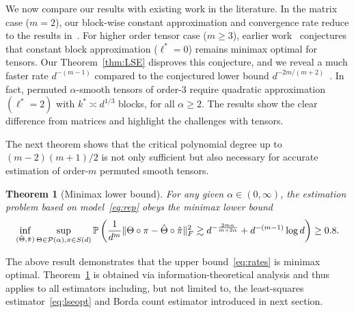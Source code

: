 \documentclass{article}
\newtheorem{thm}{Theorem}
\theoremstyle{definition}
\begin{document}
We now compare our results with existing work in the literature. %
In the matrix case ($m=2$), our block-wise constant approximation and convergence rate reduce to the results in~\cite{klopp2017oracle}. For higher order tensor case ($m\geq 3$), earlier work~\citep{balasubramanian2021nonparametric} conjectures that constant block approximation ($\ell^*=0$) remains minimax optimal for tensors. 
Our Theorem~\ref{thm:LSE} disproves this conjecture, and we reveal a much faster rate $d^{-(m-1)}$ compared to the conjectured lower bound $d^{-2m/( m+2)}$~\citep{balasubramanian2021nonparametric}. In fact, permuted $\alpha$-smooth tensors of order-3 require quadratic approximation $(\ell^*=2)$ with $k^*\asymp d^{1/3}$ blocks, for all $\alpha\geq 2$. The results show the clear difference from matrices and highlight the challenges with tensors. 

The next theorem shows that the critical polynomial degree up to $(m-2)(m+1)/2$ is not only sufficient but also necessary for accurate estimation of order-$m$ permuted smooth tensors. 

\begin{thm}[Minimax lower bound]\label{thm:minimax} For any given $\alpha\in(0,\infty)$, the estimation problem based on model~\eqref{eq:rep} obeys the minimax lower bound 
\begin{equation}\label{eq:minimax}
\inf_{(\hat \Theta,\hat \pi)}\sup_{\Theta\in \mathcal{P}(\alpha), \pi\in S(d)} \mathbb{P}\left({1\over d^m}\lVert\Theta\circ \pi-\hat \Theta\circ \hat \pi\rVert_F^2 \gtrsim d^{-{2m\alpha\over m+2\alpha}}+d^{-(m-1)}\log d \right) \geq 0.8.
\end{equation}
\end{thm}
The above result demonstrates that the upper bound~\eqref{eq:rates} is minimax optimal. Theorem~\ref{thm:minimax} is obtained via information-theoretical analysis and thus applies to all estimators including, but not limited to, the least-squares estimator~\eqref{eq:lseopt} and Borda count estimator introduced in next section. 
\end{document}

